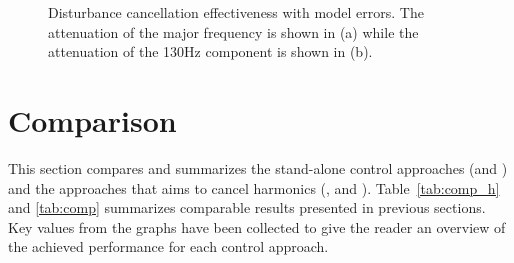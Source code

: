 \begin{figure}[h!]
  \centering %
  \qquad
  \caption{\label{fig:rfdc_model_error} Disturbance cancellation effectiveness with model errors. The attenuation of the major frequency is shown in (a) while the attenuation of the 130Hz component is shown in (b).}
\end{figure}

\newpage
\FloatBarrier
\section{Comparison}
This section compares and summarizes the stand-alone control approaches (\abbrIRC and \abbrMRACPE) and the approaches that aims to cancel harmonics (\abbrFDC, \abbrRFDC and \abbrIMP). Table~\ref{tab:comp_h} and \ref{tab:comp} summarizes comparable results presented in previous sections. Key values from the graphs have been collected to give the reader an overview of the achieved performance for each control approach.

